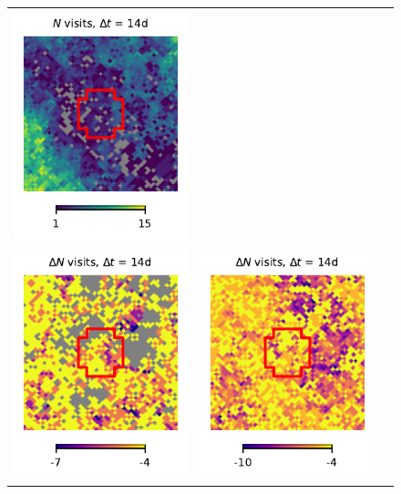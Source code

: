 \documentclass[preprintm,linenumbers]{aastex631}
\begin{document}
\begin{figure}
\begin{tabular}{  c c c}
				\includegraphics{results/skymaps_cutout/skymaps_cutout_first_year_one_snap_v4_0_10yrs_db_noDD_noTwi_tscale-14_nside-256_doAllTemplateMetrics_reduceCount_r_GP_noDD_noTwi.pdf} \\
				\includegraphics{results/skymaps_cutout/skymaps_cutout_delta_first_year_one_snap_v4_0_10yrs_db_noDD_noTwi_tscale-14_nside-256_doAllTemplateMetrics_reduceCount_r_NES_noDD_noTwi.pdf} &
				\includegraphics{results/skymaps_cutout/skymaps_cutout_delta_first_year_one_snap_v4_0_10yrs_db_noDD_noTwi_tscale-14_nside-256_doAllTemplateMetrics_reduceCount_r_WFD_noDD_noTwi.pdf} &

\end{tabular}
\end{figure}
\end{document}
